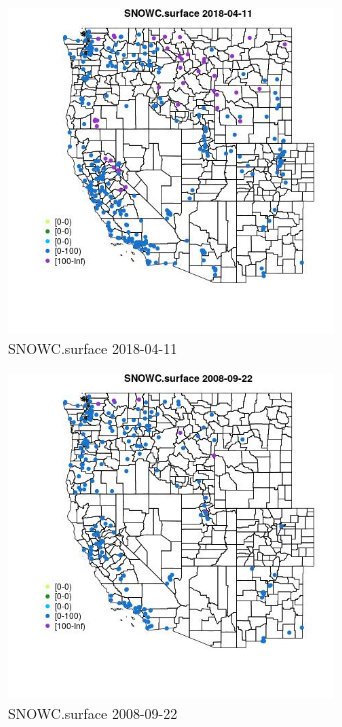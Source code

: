 \begin{figure} 
\centering  
\includegraphics[width=0.77\textwidth]{Code_Outputs/Report_ML_input_PM25_Step4_part_e_de_duplicated_aves_compiled_2019-05-18wNAs_MapObsSNOWCsurface2018-04-11.jpg} 
\caption{\label{fig:Report_ML_input_PM25_Step4_part_e_de_duplicated_aves_compiled_2019-05-18wNAsMapObsSNOWCsurface2018-04-11}SNOWC.surface 2018-04-11} 
\end{figure} 
 

\begin{figure} 
\centering  
\includegraphics[width=0.77\textwidth]{Code_Outputs/Report_ML_input_PM25_Step4_part_e_de_duplicated_aves_compiled_2019-05-18wNAs_MapObsSNOWCsurface2008-09-22.jpg} 
\caption{\label{fig:Report_ML_input_PM25_Step4_part_e_de_duplicated_aves_compiled_2019-05-18wNAsMapObsSNOWCsurface2008-09-22}SNOWC.surface 2008-09-22} 
\end{figure} 
 

